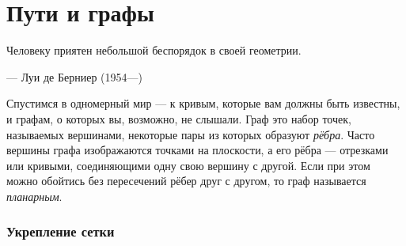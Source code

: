 \chapter{Пути и графы}

\setlength{\epigraphwidth}{.53\textwidth}
\epigraph{Человеку приятен небольшой беспорядок в своей геометрии.}{--- Луи де Берниер (1954---)}





Спустимся в одномерный мир --- к кривым, которые вам должны быть известны, и графам, о которых вы, возможно, не слышали.
Граф это набор точек, называемых вершинами, некоторые пары из которых образуют \emph{рёбра}.
Часто вершины графа изображаются точками на плоскости, а его рёбра — отрезками или кривыми, соединяющими одну свою вершину с другой.
Если при этом можно обойтись без пересечений рёбер друг с другом, то граф называется \emph{планарным}.

\subsection*{Укрепление сетки}

